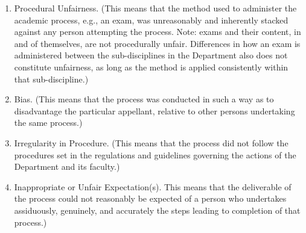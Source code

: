 \documentclass[12pt]{article}
\begin{document}
\begin{enumerate}

    \item Procedural Unfairness.  (This means that the method used to
        administer the academic process, e.g., an exam, was unreasonably and
        inherently stacked against any person attempting the process.  Note:
        exams and their content, in and of themselves, are not procedurally
        unfair.  Differences in how an exam is administered between the
        sub-disciplines in the Department also does not constitute unfairness,
        as long as the method is applied consistently within that
        sub-discipline.)

    \item Bias. (This means that the process was conducted in such a way as to
        disadvantage the particular appellant, relative to other persons
        undertaking the same process.)

    \item Irregularity in Procedure. (This means that the process did not
        follow the procedures set in the regulations and guidelines governing
        the actions of the Department and its faculty.)

    \item Inappropriate or Unfair Expectation(s). This means that the
        deliverable of the process could not reasonably be expected of a person
        who undertakes assiduously, genuinely, and accurately the steps leading
        to completion of that process.) 

\end{enumerate}

%
%
%
\end{document}
